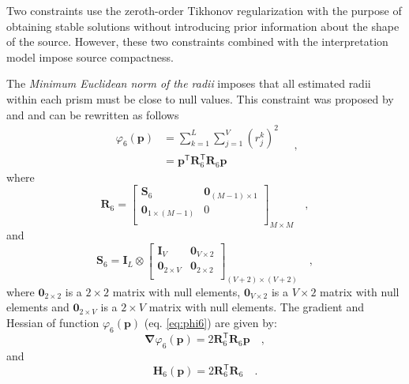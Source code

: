 Two constraints use the zeroth-order Tikhonov regularization with the purpose of obtaining stable solutions without introducing prior information about the shape of the source. 
However, these two constraints combined with the interpretation model impose 
source compactness. 

The \textit{Minimum Euclidean norm of the radii} imposes that 
all estimated radii within each prism must be close to null values. This constraint was proposed by \cite{oliveirajr-etal2011} and \cite{oliveirajr-barbosa2013} and can be rewritten as follows
\begin{equation}\label{eq:phi6}
\begin{split}
\varphi_{6}(\mathbf{p}) &= \sum\limits^{L}_{k=1}\sum\limits^{V}_{j=1}\left(r_{j}^{k}\right)^2 \\
&= \mathbf{p}^{\mathsf{T}} \mathbf{R}_{6}^{\mathsf{T}} \mathbf{R}_{6} \mathbf{p}
\end{split} \quad ,
\end{equation}
where
\begin{equation}
\mathbf{R}_{6} = 
\begin{bmatrix}
\mathbf{S}_{6} & \mathbf{0}_{(M-1) \times 1} \\
\mathbf{0}_{1 \times (M-1)} & 0 \\
\end{bmatrix}_{M\times M} \quad ,
\label{eq:R6-matrix}
\end{equation}
and 
\begin{equation}
\mathbf{S}_{6} = 
\mathbf{I}_{L} \otimes 
\begin{bmatrix}
\mathbf{I}_{V}      & \mathbf{0}_{V \times 2} \\
\mathbf{0}_{2 \times V} & \mathbf{0}_{2 \times 2} \\
\end{bmatrix}_{(V+2) \times (V+2)} \quad ,
\label{eq:S6-matrix}
\end{equation}
where $\mathbf{0}_{2 \times 2}$ is a $2 \times 2$ matrix with null elements,
$\mathbf{0}_{V \times 2}$ is a $V \times 2$ matrix with null elements and
$\mathbf{0}_{2 \times V}$ is a $2 \times V$ matrix with null elements.
The gradient and Hessian of function $\varphi_{6}(\mathbf{p})$ (eq. \ref{eq:phi6}) are given by:
\begin{equation}\label{eq:phi6_grad}
\boldsymbol{\nabla}\varphi_{6}(\mathbf{p}) = 2 \mathbf{R}_{6}^{\mathsf{T}} \mathbf{R}_{6} \mathbf{p} \quad ,
\end{equation}
and
\begin{equation}\label{eq:phi6_hessian}
\mathbf{H}_{6}(\mathbf{p}) = 2 \mathbf{R}^{\mathsf{T}}_{6}\mathbf{R}_{6} \quad .
\end{equation}

